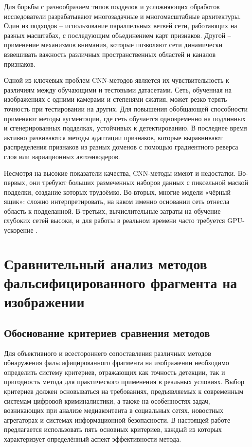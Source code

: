 Для борьбы с разнообразием типов подделок и усложняющих обработок исследователи разрабатывают многозадачные и многомасштабные архитектуры. Один из подходов – использование параллельных ветвей сети, работающих на разных масштабах, с последующим объединением карт признаков. Другой – применение механизмов внимания, которые позволяют сети динамически взвешивать важность различных пространственных областей и каналов признаков.

Одной из ключевых проблем CNN-методов является их чувствительность к различиям между обучающими и тестовыми датасетами. Сеть, обученная на изображениях с одними камерами и степенями сжатия, может резко терять точность при тестировании на других. Для повышения обобщающей способности применяют методы аугментации, где сеть обучается одновременно на подлинных и сгенерированных подделках, устойчивых к детектированию. В последнее время активно развиваются методы адаптации признаков, которые выравнивают распределения признаков из разных доменов с помощью градиентного реверса слоя или вариационных автоэнкодеров.

Несмотря на высокие показатели качества, CNN-методы имеют и недостатки. Во-первых, они требуют больших размеченных наборов данных с пиксельной маской подделки, создание которых трудоёмко. Во-вторых, многие модели «чёрный ящик»: сложно интерпретировать, на каком именно основании сеть отнесла область к подделанной. В-третьих, вычислительные затраты на обучение глубоких сетей высоки, и для работы в реальном времени часто требуется GPU-ускорение \cite{2}.

\section{Сравнительный анализ методов фальсифицированного фрагмента на изображении}

\subsection{Обоснование критериев сравнения методов}

Для объективного и всестороннего сопоставления различных методов обнаружения фальсифицированного фрагмента на изображении необходимо определить систему критериев, отражающих как точность детекции, так и пригодность метода для практического применения в реальных условиях. Выбор критериев должен основываться на требованиях, предъявляемых к современным системам цифровой криминалистики, а также на особенностях задач, возникающих при анализе медиаконтента в социальных сетях, новостных агрегаторах и системах информационной безопасности. В настоящей работе предлагается использовать пять основных критериев, каждый из которых характеризует определённый аспект эффективности метода.

